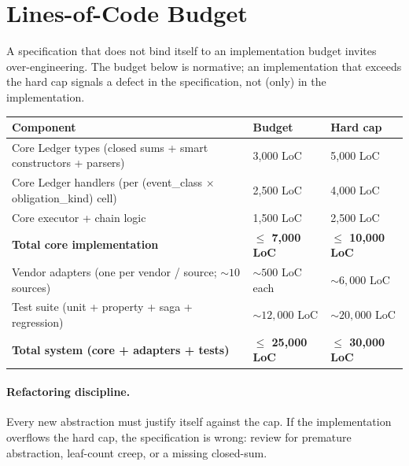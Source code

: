 \documentclass[11pt,a4paper]{article}
\begin{document}
\clearpage
\section{Lines-of-Code Budget}
\label{sec:loc}

A specification that does not bind itself to an implementation budget invites over-engineering. The budget below is normative; an implementation that exceeds the hard cap signals a defect in the specification, not (only) in the implementation.

\begin{center}
\renewcommand{\arraystretch}{1.15}
\begin{tabular}{@{}p{8cm}p{3.5cm}p{3.5cm}@{}}
\toprule
\textbf{Component} & \textbf{Budget} & \textbf{Hard cap} \\
\midrule
Core Ledger types (closed sums + smart constructors + parsers) & 3{,}000 LoC & 5{,}000 LoC \\
Core Ledger handlers (per (event\_class $\times$ obligation\_kind) cell) & 2{,}500 LoC & 4{,}000 LoC \\
Core executor + chain logic & 1{,}500 LoC & 2{,}500 LoC \\
\textbf{Total core implementation} & \textbf{$\le$ 7{,}000 LoC} & \textbf{$\le$ 10{,}000 LoC} \\
Vendor adapters (one per vendor / source; $\sim 10$ sources) & $\sim 500$ LoC each & $\sim 6{,}000$ LoC \\
Test suite (unit + property + saga + regression) & $\sim 12{,}000$ LoC & $\sim 20{,}000$ LoC \\
\textbf{Total system (core + adapters + tests)} & \textbf{$\le$ 25{,}000 LoC} & \textbf{$\le$ 30{,}000 LoC} \\
\bottomrule
\end{tabular}
\end{center}

\paragraph{Refactoring discipline.} Every new abstraction must justify itself against the cap. If the implementation overflows the hard cap, the specification is wrong: review for premature abstraction, leaf-count creep, or a missing closed-sum.

\clearpage
\end{document}
